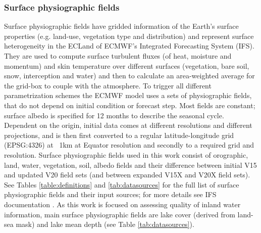 \documentclass[hess, twostagejnl]{copernicus}
\begin{document}
\subsubsection{Surface physiographic fields}
\noindent Surface physiographic fields have gridded information of the Earth’s surface properties (e.g. land-use, vegetation type and distribution) and represent surface heterogeneity in the ECLand of ECMWF’s Integrated Forecasting System (IFS). They are used to compute surface turbulent fluxes (of heat, moisture and momentum) and skin temperature over different surfaces (vegetation, bare soil, snow, interception and water) and then to calculate an area-weighted average for the grid-box to couple with the atmosphere. To trigger all different parametrization schemes the ECMWF model uses a sets of physiographic fields, that do not depend on initial condition or forecast step. Most fields are constant; surface albedo is specified for 12 months to describe the seasonal cycle. Dependent on the origin, initial data comes at different resolutions and different projections, and is then first converted to a regular latitude-longitude grid (EPSG:4326) at ~1km at Equator resolution and secondly to a required grid and resolution. Surface physiographic fields used in this work consist of orographic, land, water, vegetation, soil, albedo fields and their difference between initial V15 and updated V20 field sets (and between expanded V15X and V20X field sets). See Tables \ref{table:definitions} and \ref{tab:datasources} for the full list of surface physiographic fields and their input sources; for more details see IFS documentation \citep{IFSdocs}. As this work is focused on assessing quality of inland water information, main surface physiographic fields are lake cover (derived from land-sea mask) and lake mean depth (see Table \ref{tab:datasources}).  \newline 
\end{document}
